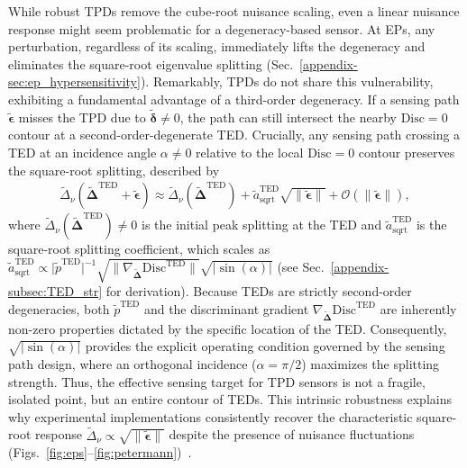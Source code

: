 \documentclass[%
  reprint,
  amsmath,amssymb,
  aps,
  prapplied,
  superscriptaddress,
  longbibliography]{revtex4-2}
\begin{document}
While robust TPDs remove the cube-root nuisance scaling, even a linear nuisance response might seem problematic for a degeneracy-based sensor. At EPs, any perturbation, regardless of its scaling, immediately lifts the degeneracy and eliminates the square-root eigenvalue splitting (Sec.~\ref{appendix-sec:ep_hypersensitivity}). Remarkably, TPDs do not share this vulnerability, exhibiting a fundamental advantage of a third-order degeneracy. If a sensing path $\boldsymbol{\tilde{\epsilon}}$ misses the TPD due to $\boldsymbol{\tilde{\delta}} \neq 0$, the path can still intersect the nearby $\mathrm{Disc} = 0$ contour at a second-order-degenerate TED. Crucially, any sensing path crossing a TED at an incidence angle $\alpha \neq 0$ relative to the local $\mathrm{Disc} = 0$ contour preserves the square-root splitting, described by
\begin{align}
\tilde{\Delta}_\nu(\boldsymbol{\tilde{\Delta}}^\text{TED}+\boldsymbol{\tilde{\epsilon}}) \approx \tilde{\Delta}_\nu(\boldsymbol{\tilde{\Delta}}^\text{TED}) + \tilde{a}_\text{sqrt}^\text{TED} \sqrt{\lVert \boldsymbol{\tilde{\epsilon}} \rVert} + \mathcal{O}(\lVert \boldsymbol{\tilde{\epsilon}} \rVert), \label{eq:splitting_expansion}
\end{align}
where $\tilde{\Delta}_\nu(\boldsymbol{\tilde{\Delta}}^\text{TED}) \neq 0$ is the initial peak splitting at the TED and $\tilde{a}_\text{sqrt}^\text{TED}$ is the square-root splitting coefficient, which scales as $\tilde{a}_\text{sqrt}^\text{TED} \propto \lvert \tilde{p}^\text{TED} \rvert^{-1} \sqrt{\lVert \nabla_{\boldsymbol{\tilde{\Delta}}}\mathrm{Disc}^\text{TED} \rVert} \sqrt{\lvert \sin(\alpha) \rvert}$ (see Sec.~\ref{appendix-subsec:TED_str} for derivation). Because TEDs are strictly second-order degeneracies, both $\tilde{p}^\text{TED}$ and the discriminant gradient $\nabla_{\boldsymbol{\tilde{\Delta}}}\mathrm{Disc}^\text{TED}$ are inherently non-zero properties dictated by the specific location of the TED. Consequently, $\sqrt{\lvert \sin(\alpha) \rvert}$ provides the explicit operating condition governed by the sensing path design, where an orthogonal incidence ($\alpha = \pi/2$) maximizes the splitting strength. Thus, the effective sensing target for TPD sensors is not a fragile, isolated point, but an entire contour of TEDs. This intrinsic robustness explains why experimental implementations consistently recover the characteristic square-root response $\tilde{\Delta}_\nu \propto \sqrt{\lVert \boldsymbol{\tilde{\epsilon}} \rVert}$ despite the presence of nuisance fluctuations (Figs.~\ref{fig:eps}--\ref{fig:petermann})~\cite{lu_harnessing_2025, kononchuk_exceptional-point-based_2022}.
\end{document}
